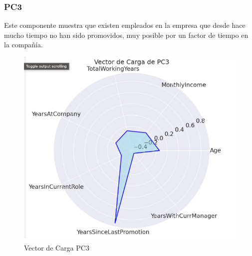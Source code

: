 \subsubsection{PC3}

Este componente muestra que existen empleados en la empresa que desde hace mucho tiempo
no han sido promovidos, muy posible por un factor de tiempo en la compañía.

\begin{figure}[H]
    \centering
    \includegraphics[width=1\textwidth]{images/pollar_pc3.png}
    \caption{Vector de Carga PC3}
    \label{fig:vector_pc3}
\end{figure}

